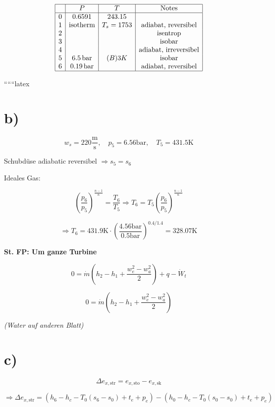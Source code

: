 \[
\begin{array}{|c|c|c|c|}
\hline
 & P & T & \text{Notes} \\
\hline
0 & 0.6591 & 243.15 & \\
1 & \text{isotherm} & T_s = 1753 & \text{adiabat, reversibel} \\
2 & & & \text{isentrop} \\
3 & & & \text{isobar} \\
4 & & & \text{adiabat, irreversibel} \\
5 & 6.5 \, \text{bar} & (B) 3K & \text{isobar} \\
6 & 0.19 \, \text{bar} & & \text{adiabat, reversibel} \\
\hline
\end{array}
\]

``````latex

\section*{b)}

\[
w_s = 220 \frac{\text{m}}{\text{s}}, \quad p_5 = 6.56 \text{bar}, \quad T_5 = 431.5 \text{K}
\]

Schubdüse adiabatic reversibel \(\Rightarrow s_5 = s_6\)

Ideales Gas:

\[
\left( \frac{p_6}{p_5} \right)^{\frac{n-1}{n}} = \frac{T_6}{T_5} \Rightarrow T_6 = T_5 \left( \frac{p_6}{p_5} \right)^{\frac{n-1}{n}}
\]

\[
\Rightarrow T_6 = 431.9 \text{K} \cdot \left( \frac{4.56 \text{bar}}{0.5 \text{bar}} \right)^{0.4/1.4} = 328.07 \text{K}
\]

\textbf{St. FP: Um ganze Turbine}

\[
0 = \dot{m} (h_2 - h_1 + \frac{w_e^2 - w_a^2}{2}) + q - \dot{W}_t
\]

\[
0 = \dot{m} (h_2 - h_1 + \frac{w_e^2 - w_a^2}{2})
\]

\textit{(Water auf anderen Blatt)}

\section*{c)}

\[
\Delta e_{x, \text{str}} = e_{x, \text{sto}} - e_{x, \text{sk}}
\]

\[
\Rightarrow \Delta e_{x, \text{str}} = \left( h_6 - h_c - T_0 (s_6 - s_0) + t_e + p_e \right) - \left( h_0 - h_c - T_0 (s_0 - s_0) + t_e + p_e \right)
\]

